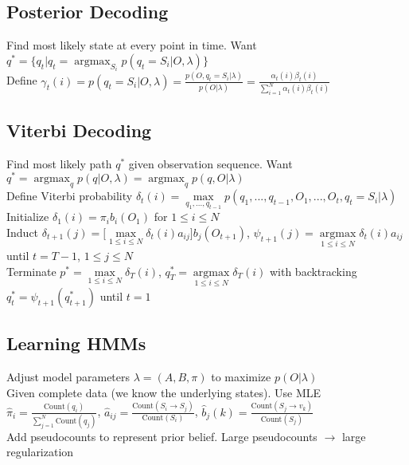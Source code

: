 \documentclass{article}
\renewcommand{\P}{p}
\DeclareMathOperator*{\argmax}{argmax}
\begin{document}
\subsection{Posterior Decoding}
Find most likely state at every point in time. Want $q^* = \{q_t | q_t = \argmax_{S_i}\P(q_t = S_i | O, \lambda)\}$ \\
Define $\gamma_t(i) = \P(q_t = S_i | O, \lambda) = \frac{\P(O, q_t = S_i | \lambda)}{\P(O | \lambda)} = \frac{\alpha_t(i)\beta_t(i)}{\sum_{i=1}^N \alpha_t(i)\beta_t(i)}$

\subsection{Viterbi Decoding}
Find most likely path $q^*$ given observation sequence. Want $q^* = \argmax_q \P(q | O, \lambda) = \argmax_q \P(q, O | \lambda)$ \\
Define Viterbi probability $\delta_t(i) = \max\limits_{q_1, ..., q_{t-1}}\P(q_1, ..., q_{t-1}, O_1, ..., O_t, q_{t} = S_i| \lambda)$ \\
Initialize $\delta_1(i) = \pi_i b_i(O_1)$ for $1 \leq i \leq N$ \\
Induct $\delta_{t+1}(j) = \big[\max\limits_{1\leq i\leq N} \delta_t(i)a_{ij}\big] b_j(O_{t+1})$, $\psi_{t+1}(j) = \argmax\limits_{1 \leq i \leq N} \delta_t(i)a_{ij}$ until $t = T-1$, $1\leq j \leq N$ \\
Terminate $p^*=\max\limits_{1\leq i \leq N} \delta_T(i)$, $q^*_T = \argmax\limits_{1 \leq i \leq N} \delta_T(i)$ with backtracking $q^*_t = \psi_{t+1}(q^*_{t+1})$ until $t=1$

\subsection{Learning HMMs}
Adjust model parameters $\lambda = (A, B, \pi)$ to maximize $\P(O | \lambda)$ \\
Given complete data (we know the underlying states). Use MLE \\
$\hat{\pi}_i = \frac{\text{Count}(q_i)}{\sum_{j=1}^N \text{Count}(q_j)}$, $\hat{a}_{ij} = \frac{\text{Count}(S_i \to S_j)}{\text{Count}(S_i)}$, $\hat{b}_j(k) = \frac{\text{Count}(S_j \to v_k)}{\text{Count}(S_j)}$ \\
Add pseudocounts to represent prior belief. Large pseudocounts $\to$ large regularization
\end{document}
